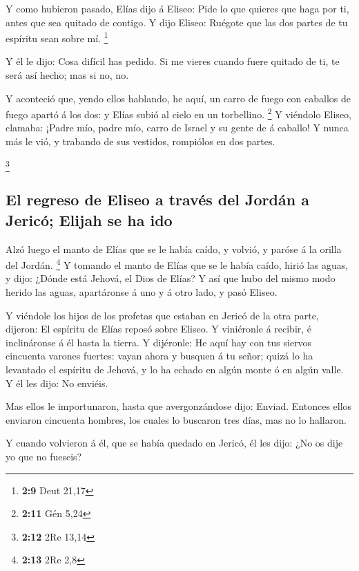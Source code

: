  Y como hubieron pasado, Elías dijo á Eliseo: Pide lo que
quieres que haga por ti, antes que sea quitado de contigo. Y dijo
Eliseo: Ruégote que las dos partes de tu espíritu sean sobre mí.
\footnote{\textbf{2:9} Deut 21,17}

 Y él le dijo: Cosa difícil has pedido. Si me vieres
cuando fuere quitado de ti, te será así hecho; mas si no, no.

 Y aconteció que, yendo ellos hablando, he aquí, un carro
de fuego con caballos de fuego apartó á los dos: y Elías subió al cielo
en un torbellino. \footnote{\textbf{2:11} Gén 5,24}  Y
viéndolo Eliseo, clamaba: ¡Padre mío, padre mío, carro de Israel y su
gente de á caballo! Y nunca más le vió, y trabando de sus vestidos,
rompiólos en dos partes.

\footnote{\textbf{2:12} 2Re 13,14}

\hypertarget{el-regreso-de-eliseo-a-travuxe9s-del-jorduxe1n-a-jericuxf3-elijah-se-ha-ido}{%
\subsection{El regreso de Eliseo a través del Jordán a Jericó; Elijah se
ha
ido}\label{el-regreso-de-eliseo-a-travuxe9s-del-jorduxe1n-a-jericuxf3-elijah-se-ha-ido}}

 Alzó luego el manto de Elías que se le había caído, y
volvió, y paróse á la orilla del Jordán. \footnote{\textbf{2:13} 2Re 2,8}
 Y tomando el manto de Elías que se le había caído, hirió
las aguas, y dijo: ¿Dónde está Jehová, el Dios de Elías? Y así que hubo
del mismo modo herido las aguas, apartáronse á uno y á otro lado, y pasó
Eliseo.

 Y viéndole los hijos de los profetas que estaban en
Jericó de la otra parte, dijeron: El espíritu de Elías reposó sobre
Eliseo. Y viniéronle á recibir, é inclináronse á él hasta la tierra.
 Y dijéronle: He aquí hay con tus siervos cincuenta
varones fuertes: vayan ahora y busquen á tu señor; quizá lo ha levantado
el espíritu de Jehová, y lo ha echado en algún monte ó en algún valle. Y
él les dijo: No enviéis.

 Mas ellos le importunaron, hasta que avergonzándose
dijo: Enviad. Entonces ellos enviaron cincuenta hombres, los cuales lo
buscaron tres días, mas no lo hallaron.

 Y cuando volvieron á él, que se había quedado en Jericó,
él les dijo: ¿No os dije yo que no fueseis?

